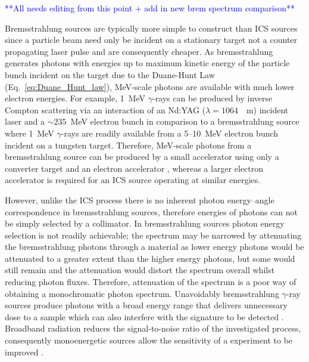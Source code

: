 \documentclass[../main.tex]{subfiles}
\begin{document}
\textcolor{blue}{**All needs editing from this point + add in new brem spectrum comparison**}

Bremsstrahlung sources are typically more simple to construct than ICS sources since a particle beam need only be incident on a stationary target not a counter propagating laser pulse and are consequently cheaper. As bremsstrahlung generates photons with energies up to maximum kinetic energy of the particle bunch incident on the target due to the Duane-Hunt Law (Eq.~\ref{eq:Duane_Hunt_law}), \si{\mega\electronvolt}-scale photons are available with much lower electron energies. For example, 1~\si{\mega\electronvolt} $\gamma$-rays can be produced by inverse Compton scattering via an interaction of an Nd:YAG ($\lambda = 1064$~\si{\nao\meter}) incident laser and a $\sim 235$~\si{\mega\electronvolt} electron bunch in comparison to a bremsstrahlung source where 1~\si{\mega\electronvolt} $\gamma$-rays are readily available from a 5--10~\si{\mega\electronvolt} electron bunch incident on a tungsten target. Therefore, \si{\mega\electronvolt}-scale photons from a bremsstrahlung source can be produced by a small accelerator using only a converter target and an electron
accelerator \cite{chin2021application}, whereas a larger electron accelerator is required for an ICS source operating at similar energies.

However, unlike the ICS process there is no inherent photon energy--angle correspondence in bremsstrahlung sources, therefore energies of photons can not be simply selected by a collimator. In bremsstrahlung sources photon energy selection is not readily achievable; the spectrum may be narrowed by attenuating the bremsstrahlung photons through a material as lower energy photons would be attenuated to a greater extent than the higher energy photons, but some would still remain and the attenuation would distort the spectrum overall whilst reducing photon fluxes. Therefore, attenuation of the spectrum is a poor way of obtaining a monochromatic photon spectrum. Unavoidably bremsstrahlung $\gamma$-ray sources produce photons with a broad energy range that delivers unnecessary dose to a sample which can also interfere with the signature to be detected \cite{geddes2017impact}. Broadband radiation reduces the signal-to-noise ratio of the investigated process, consequently monoenergetic sources allow the sensitivity of a experiment to be improved \cite{jones2008bremsstrahlung}.
\end{document}
